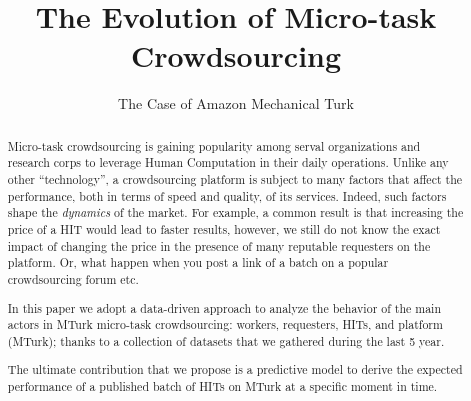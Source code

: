 \documentclass{sig-alternate}
\begin{document}
%

\title{The Evolution of Micro-task Crowdsourcing}
\subtitle{The Case of Amazon Mechanical Turk}


\author{}

\maketitle
\begin{abstract}

Micro-task crowdsourcing is gaining popularity among serval organizations and research corps to leverage Human Computation in their daily operations. Unlike any other ``technology'', a crowdsourcing platform is subject to many factors that affect the performance, both in terms of speed and quality, of its services. Indeed, such factors shape the \emph{dynamics} of the market. For example, a common result is that increasing the price of a HIT would lead to faster results, however, we still do not know the exact impact of changing the price in the presence of many reputable requesters on the platform. Or, what happen when you post a link of a batch on a popular crowdsourcing forum etc.

In this paper we adopt a data-driven approach to analyze the behavior of the main actors in MTurk micro-task crowdsourcing: workers, requesters, HITs, and platform (MTurk); thanks to a collection of datasets that we gathered during the last 5 year.

The ultimate contribution that we propose is a predictive model to derive the expected performance of a published batch of HITs on MTurk at a specific moment in time.

\end{abstract}

\end{document}
